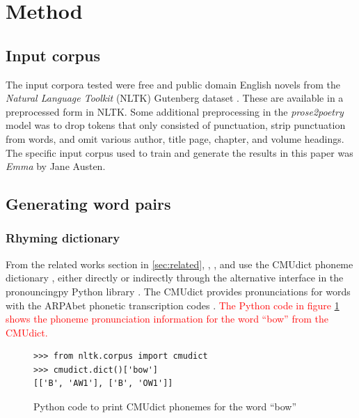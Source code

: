 \documentclass[11pt,a4paper]{article}
\begin{document}
\section{Method}
\label{sec:method}

\subsection{Input corpus}

The input corpora tested were free and public domain English novels from the \textit{Natural Language Toolkit} (NLTK) Gutenberg dataset \cite[Chapter~2]{gutenbergnltk}. These are available in a preprocessed form in NLTK. Some additional preprocessing in the \textit{prose2poetry} model was to drop tokens that only consisted of punctuation, strip punctuation from words, and omit various author, title page, chapter, and volume headings. The specific input corpus used to train and generate the results in this paper was \textit{Emma} by Jane Austen.

\subsection{Generating word pairs}

\subsubsection{Rhyming dictionary}

From the related works section in \ref{sec:related}, \citet{keswarani}, \citet{cole}, and \citet{hopkins-kiela-2017} use the CMUdict phoneme dictionary \cite{cmudict}, either directly or indirectly through the alternative interface in the pronouncingpy Python library \cite{pronouncingpy}. The CMUdict provides pronunciations for words with the ARPAbet phonetic transcription codes \cite[Chapter~27]{jurafsky}. \textcolor{red}{The Python code in figure \ref{fig:cmudict} shows the phoneme pronunciation information for the word ``bow'' from the CMUdict.}

\begin{figure}
\begin{Verbatim}[fontsize=\small]
>>> from nltk.corpus import cmudict
>>> cmudict.dict()['bow']
[['B', 'AW1'], ['B', 'OW1']]
\end{Verbatim}
\caption{Python code to print CMUdict phonemes for the word ``bow''}
\label{fig:cmudict}
\end{figure}
\end{document}

